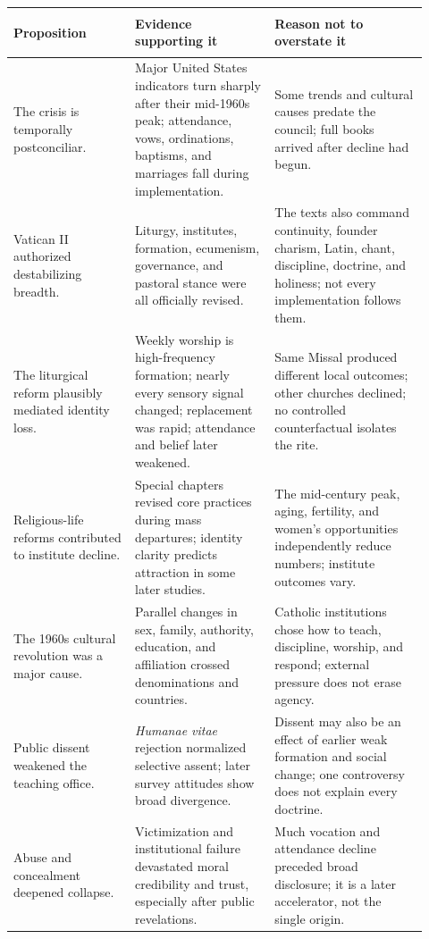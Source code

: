 \begin{longtable}{>{\bfseries\raggedright\arraybackslash}p{0.27\linewidth}>{\raggedright\arraybackslash}p{0.31\linewidth}>{\raggedright\arraybackslash}p{0.34\linewidth}}
\toprule
\textbf{Proposition} & \textbf{Evidence supporting it} & \textbf{Reason not to overstate it}\\
\midrule
\endhead
The crisis is temporally postconciliar. & Major United States indicators turn sharply after their mid-1960s peak; attendance, vows, ordinations, baptisms, and marriages fall during implementation. & Some trends and cultural causes predate the council; full books arrived after decline had begun.\\
Vatican II authorized destabilizing breadth. & Liturgy, institutes, formation, ecumenism, governance, and pastoral stance were all officially revised. & The texts also command continuity, founder charism, Latin, chant, discipline, doctrine, and holiness; not every implementation follows them.\\
The liturgical reform plausibly mediated identity loss. & Weekly worship is high-frequency formation; nearly every sensory signal changed; replacement was rapid; attendance and belief later weakened. & Same Missal produced different local outcomes; other churches declined; no controlled counterfactual isolates the rite.\\
Religious-life reforms contributed to institute decline. & Special chapters revised core practices during mass departures; identity clarity predicts attraction in some later studies. & The mid-century peak, aging, fertility, and women's opportunities independently reduce numbers; institute outcomes vary.\\
The 1960s cultural revolution was a major cause. & Parallel changes in sex, family, authority, education, and affiliation crossed denominations and countries. & Catholic institutions chose how to teach, discipline, worship, and respond; external pressure does not erase agency.\\
Public dissent weakened the teaching office. & \emph{Humanae vitae} rejection normalized selective assent; later survey attitudes show broad divergence. & Dissent may also be an effect of earlier weak formation and social change; one controversy does not explain every doctrine.\\
Abuse and concealment deepened collapse. & Victimization and institutional failure devastated moral credibility and trust, especially after public revelations. & Much vocation and attendance decline preceded broad disclosure; it is a later accelerator, not the single origin.\\

\end{longtable}
